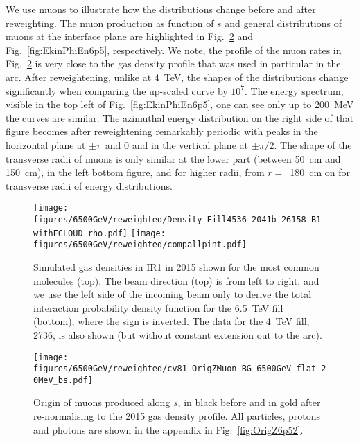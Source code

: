 We use muons to illustrate how the distributions change before and after reweighting. The muon production as function of $s$ and general distributions of muons at the interface plane are highlighted in Fig.~\ref{fig:OrigZ6p5} and Fig.~\ref{fig:EkinPhiEn6p5}, respectively. We note, the profile of the muon rates in Fig.~\ref{fig:OrigZ6p5} is very close to the gas density profile that was used in particular in the arc. After reweightening, unlike at 4~TeV, the shapes of the distributions change significantly when comparing the up-scaled curve by $10^7$. The energy spectrum, visible in the top left of Fig.~\ref{fig:EkinPhiEn6p5}, one can see only up to 200~MeV the curves are similar. The azimuthal energy distribution on the right side of that figure becomes after reweightening remarkably periodic with peaks in the horizontal plane at $\pm \pi$ and $0$ and in the vertical plane at $\pm \pi/2$. The shape of the transverse radii of muons is only similar at the lower part (between 50~cm and 150~cm), in the left bottom figure, and for higher radii, from $r =$~180~cm on for transverse radii of energy distributions.

\begin{figure}
\begin{center}
  \texttt{[image: figures/6500GeV/reweighted/Density\_Fill4536\_2041b\_26158\_B1\_withECLOUD\_rho.pdf]}
  \texttt{[image: figures/6500GeV/reweighted/compallpint.pdf]}
\end{center}
\vspace{-0.6cm}
 \caption{Simulated gas densities in IR1 in 2015 shown for the most common molecules (top). The beam direction (top) is from left to right, and we use the left side of the incoming beam only to derive the total interaction probability density function for the 6.5~TeV fill (bottom), where the sign is inverted. The data for the 4~TeV fill, 2736, is also shown (but without constant extension out to the arc).
  \label{pressure2015}}
\end{figure}

\begin{figure}
\begin{center}
  \texttt{[image: figures/6500GeV/reweighted/cv81\_OrigZMuon\_BG\_6500GeV\_flat\_20MeV\_bs.pdf]}
\end{center}
\vspace{-0.6cm}
 \caption{Origin of muons produced along $s$, in black before and in gold after re-normalising to the 2015 gas density profile. All particles, protons and photons are shown in the appendix in Fig.~\ref{fig:OrigZ6p52}. 
  \label{fig:OrigZ6p5}}
\end{figure}

